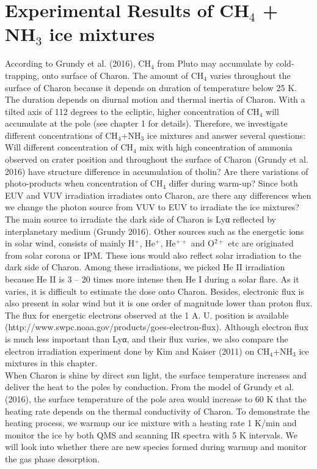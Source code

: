 \chapter{\protect Experimental Results of CH$_4$ + NH$_3$ ice mixtures}
According to Grundy et al. (2016), CH$_4$ from Pluto may accumulate by cold-trapping, onto surface of Charon. The amount of CH$_4$ varies throughout the surface of Charon because it depends on duration of temperature below 25 K. The duration depends on diurnal motion and thermal inertia of Charon. With a tilted axis of 112 degrees to the ecliptic, higher concentration of CH$_4$ will accumulate at the pole (see chapter 1 for details). Therefore, we investigate different concentrations of CH$_4$+NH$_3$ ice mixtures and answer several questions: Will different concentration of CH$_4$ mix with high concentration of ammonia observed on crater position and throughout the surface of Charon (Grundy et al. 2016) have structure difference in accumulation of tholin? Are there variations of photo-products when concentration of CH$_4$ differ during warm-up? Since both EUV and VUV irradiation irradiates onto Charon, are there any differences when we change the photon source from VUV to EUV to irradiate the ice mixtures?\\

The main source to irradiate the dark side of Charon is Lyα reflected by interplanetary medium (Grundy 2016). Other sources such as the energetic ions in solar wind, consists of mainly H$^+$, He$^+$, He$^{++}$ and O$^{2+}$ etc are originated from solar corona or IPM. These ions would also reflect solar irradiation to the dark side of Charon. Among these irradiations, we picked He II irradiation because He II is 3 – 20 times more intense then He I during a solar flare. As it varies, it is difficult to estimate the dose onto Charon. Besides, electronic flux is also present in solar wind but it is one order of magnitude lower than proton flux. The flux for energetic electrons observed at the 1 A. U. position is available (http://www.swpc.noaa.gov/products/goes-electron-flux). Although electron flux is much less important than Lyα, and their flux varies, we also compare the electron irradiation experiment done by Kim and Kaiser (2011) on CH$_4$+NH$_3$ ice mixtures in this chapter. \\

When Charon is shine by direct sun light, the surface temperature increases and deliver the heat to the poles by conduction. From the model of Grundy et al. (2016), the surface temperature of the pole area would increase to 60 K that the heating rate depends on the thermal conductivity of Charon. To demonstrate the heating process, we warmup our ice mixture with a heating rate 1 K/min and monitor the ice by both QMS and scanning IR spectra with 5 K intervals. We will look into whether there are new species formed during warmup and monitor the gas phase desorption.\\


